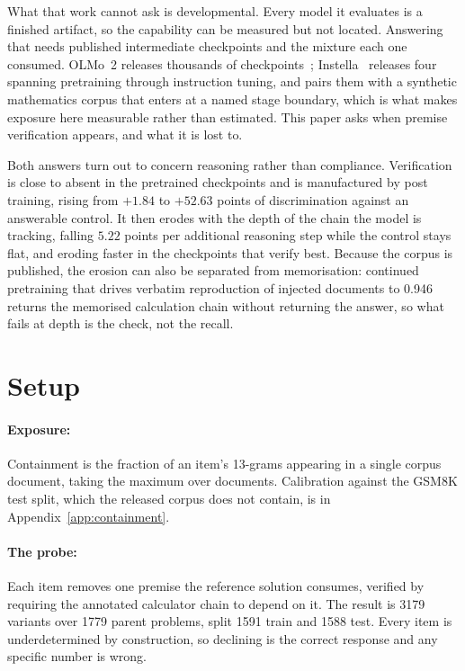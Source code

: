 \documentclass{article}
\begin{document}
What that work cannot ask is developmental. Every model it evaluates is a finished artifact,
so the capability can be measured but not located. Answering that needs published
intermediate checkpoints and the mixture each one consumed. OLMo~2 releases thousands of
checkpoints~\citep{olmo2025olmo2}; Instella~\citep{instella2025} releases four spanning
pretraining through instruction tuning, and pairs them with a synthetic mathematics corpus
that enters at a named stage boundary, which is what makes exposure here measurable rather
than estimated. This paper asks when premise verification appears, and what it is lost to.

Both answers turn out to concern reasoning rather than compliance. Verification is close to
absent in the pretrained checkpoints and is manufactured by post training, rising from $+1.84$
to $+52.63$ points of discrimination against an answerable control. It then erodes with the
depth of the chain the model is tracking, falling $5.22$ points per additional reasoning step
while the control stays flat, and eroding faster in the checkpoints that verify best. Because
the corpus is published, the erosion can also be separated from memorisation: continued
pretraining that drives verbatim reproduction of injected documents to 0.946 returns the
memorised calculation chain without returning the answer, so what fails at depth is the check,
not the recall.

\section{Setup}

\paragraph{Exposure:} Containment is the fraction of an item's 13-grams appearing in a
single corpus document, taking the maximum over documents. Calibration against the GSM8K test
split, which the released corpus does not contain, is in Appendix~\ref{app:containment}.

\paragraph{The probe:} Each item removes one premise the reference solution consumes,
verified by requiring the annotated calculator chain to depend on it. The result is 3179
variants over 1779 parent problems, split 1591 train and 1588 test. Every item is
underdetermined by construction, so declining is the correct response and any specific number
is wrong.
\end{document}
